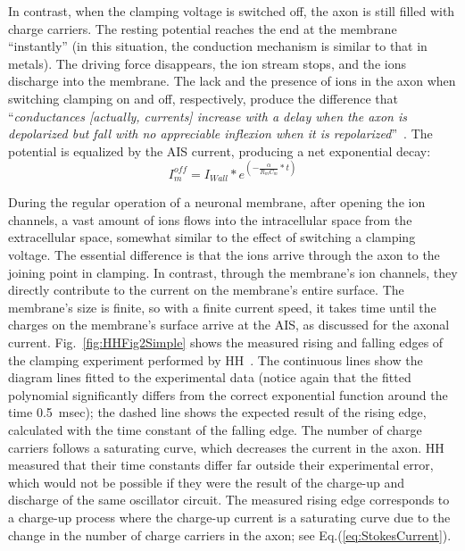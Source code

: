 In contrast, when the clamping voltage is switched off, the axon is still
filled with charge carriers. The resting potential reaches the end
at the membrane ``instantly'' (in this situation, the conduction mechanism is similar to that in metals). The driving force disappears, the
ion stream stops, and the ions discharge into the membrane. The lack and
the presence of ions in the axon when switching clamping on and off, respectively, produce the difference that ``\emph{conductances [actually, currents]
	increase with a delay when the axon is depolarized but fall with no
	appreciable inflexion when it is repolarized}''~\cite{HodgkinHuxley:1952}.
The potential is equalized by the \gls{AIS}
current, producing a net exponential decay:
%
\begin{equation}
	I_{m}^{off}=I_{Wall}*e^{(-\frac{\alpha}{R_{m}C_{m}}*t)}\label{eq:I_Membrane_Off}
\end{equation}
\else

\fi

\ifx\magyar\undefined
During the regular operation of a neuronal membrane, after opening
the ion channels, a vast amount of ions flows into the intracellular
space from the extracellular space, somewhat similar to the effect of switching
a clamping voltage. The essential difference is that
the ions arrive through the axon to the joining point in clamping. In contrast, through the membrane's ion channels, they directly contribute to the current on the membrane’s entire surface. The membrane's size is finite, so with a finite
current speed, it takes time until the charges on the membrane's surface
arrive at the \gls{AIS}, as discussed for the
axonal current.
Fig.~\ref{fig:HHFig2Simple} shows the measured rising and falling edges
of the clamping experiment performed by \gls{HH}~\cite{HodgkinHuxley:1952}.
The continuous lines show the 
diagram lines fitted to the experimental data (notice again that the fitted polynomial significantly differs from  the correct exponential function around the time 0.5~msec); the dashed line shows the expected result of the rising edge, calculated with the time constant of the falling edge. The number of charge carriers follows a saturating curve, which decreases the current in the axon.
\gls{HH} measured that their time constants differ far outside
their experimental error, which would not be possible if they were
the result of the charge-up and discharge of the same oscillator circuit.
The measured rising edge corresponds to a charge-up process where the 
charge-up current is a saturating curve due to the change in the number of
charge carriers in the axon; see Eq.(\ref{eq:StokesCurrent}).
\else

